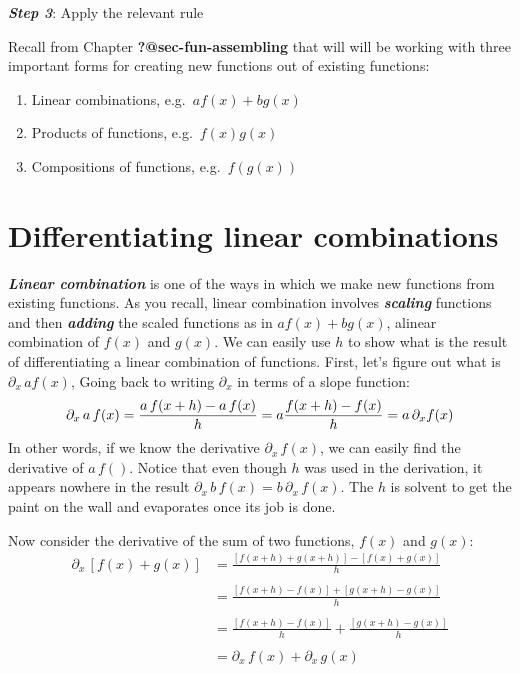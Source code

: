 \documentclass[
  letterpaper,
  DIV=11,
  numbers=noendperiod,
  oneside]{scrreprt}
\providecommand{\tightlist}{%
  \setlength{\itemsep}{0pt}\setlength{\parskip}{0pt}}
\begin{document}
\textbf{\emph{Step 3}}: Apply the relevant rule

Recall from Chapter \textbf{?@sec-fun-assembling} that will will be
working with three important forms for creating new functions out of
existing functions:

\begin{enumerate}
\def\labelenumi{\arabic{enumi}.}
\tightlist
\item
  Linear combinations, e.g.~\(a f(x) + bg(x)\)
\item
  Products of functions, e.g.~\(f(x) g(x)\)
\item
  Compositions of functions, e.g.~\(f\left(g(x)\right)\)
\end{enumerate}

\hypertarget{differentiating-linear-combinations}{%
\section{Differentiating linear
combinations}\label{differentiating-linear-combinations}}

\textbf{\emph{Linear combination}} is one of the ways in which we make
new functions from existing functions. As you recall, linear combination
involves \textbf{\emph{scaling}} functions and then
\textbf{\emph{adding}} the scaled functions as in \(a f(x) + b g(x)\),
alinear combination of \(f(x)\) and \(g(x)\). We can easily use \(h\) to
show what is the result of differentiating a linear combination of
functions. First, let's figure out what is \(\partial_x\, a f(x)\),
Going back to writing \(\partial_x\) in terms of a slope function:
\[\partial_x\, a\,f(x) = \frac{a\, f(x + h) - a\,f(x)}{h}\\
\ \\
= a \frac{f(x+h) - f(x)}{h} = a\, \partial_x f(x)\] In other words, if
we know the derivative \(\partial_x\, f(x)\), we can easily find the
derivative of \(a\, f()\). Notice that even though \(h\) was used in the
derivation, it appears nowhere in the result
\(\partial_x\, b\,f(x) = b\, \partial_x\, f(x)\). The \(h\) is solvent
to get the paint on the wall and evaporates once its job is done.

Now consider the derivative of the sum of two functions, \(f(x)\) and
\(g(x)\): \begin{eqnarray}
\partial_x\, \left[f(x) + g(x)\right] & =\frac{\left[f(x + h) + g(x + h)\right] - \left[f(x) + g(x)\right]}{h} \\
\ \\
&= \frac{\left[f(x+h) -f(x)\right] + \left[g(x+h) - g(x)\right]}{h}\\
\ \\
&= \frac{\left[f(x+h) -f(x)\right]}{h} + \frac{\left[g(x+h) - g(x)\right]}{h}\\
\ \\
&= \partial_x\, f(x) + \partial_x\, g(x)
\end{eqnarray}
\end{document}
